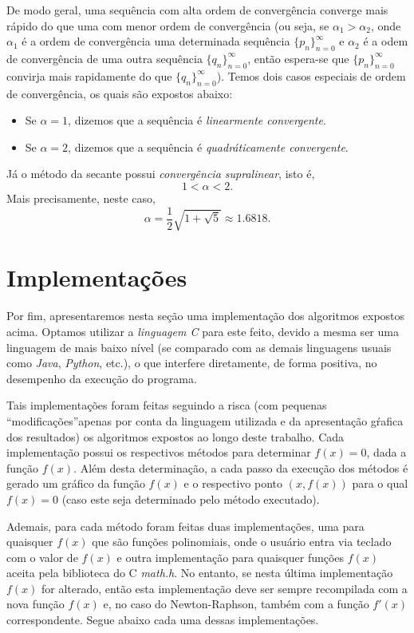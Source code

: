 \documentclass[a4paper, 10pt]{article} %
\theoremstyle{definition}
\theoremstyle{definition}
\numberwithin{equation}{section} %
\numberwithin{lstlisting}{section}
\numberwithin{algorithm}{section}
\numberwithin{table}{section}
\begin{document}
De modo geral, uma sequência com alta ordem de convergência converge mais rápido do que uma com menor ordem de convergência (ou seja, se $\alpha_1 > \alpha_2$, onde $\alpha_1$ é a ordem de convergência uma determinada sequência $\{p_n\}^{\infty}_{n = 0}$ e $\alpha_2$ é a odem de convergência de uma outra sequência $\{q_n\}^{\infty}_{n = 0}$, então espera-se que $\{p_n\}^{\infty}_{n = 0}$ convirja mais rapidamente do que $\{q_n\}^{\infty}_{n = 0}$). Temos dois casos especiais de ordem de convergência, os quais são expostos abaixo:

\begin{itemize}
\item Se $\alpha = 1$, dizemos que a sequência é \emph{linearmente convergente}.
\item Se $\alpha = 2$, dizemos que a sequência é \emph{quadráticamente convergente}.
\end{itemize}

Já o método da secante possui \emph{convergência supralinear}, isto é, \[1 < \alpha < 2\text{.}\] Mais precisamente, neste caso, \[\alpha = \frac{1}{2}\sqrt{1 + \sqrt{5}} \approx 1.6818\text{.}\]

\section{Implementações}

Por fim, apresentaremos nesta seção uma implementação dos algoritmos expostos acima. Optamos utilizar a \emph{linguagem C} para este feito, devido a mesma ser uma linguagem de mais baixo nível (se comparado com as demais linguagens usuais como \emph{Java}, \emph{Python}, etc.), o que interfere diretamente, de forma positiva, no desempenho da execução do programa. 

Tais implementações foram feitas seguindo a risca (com pequenas \textquotedblleft modificações\textquotedblright apenas por conta da linguagem utilizada e da apresentação gŕafica dos resultados) os algoritmos expostos ao longo deste trabalho. Cada implementação possui os respectivos métodos para determinar $f(x) = 0$, dada a função $f(x)$. Além desta determinação, a cada passo da execução dos métodos é gerado um gráfico da função $f(x)$ e o respectivo ponto $(x, f(x))$ para o qual $f(x) = 0$ (caso este seja determinado pelo método executado). 

Ademais, para cada método foram feitas duas implementações, uma para quaisquer $f(x)$ que são funções polinomiais, onde o usuário entra via teclado com o valor de $f(x)$ e outra implementação para quaisquer funções $f(x)$ aceita pela biblioteca do C \emph{math.h}. No entanto, se nesta última implementação $f(x)$ for alterado, então esta implementação deve ser sempre recompilada com a nova função $f(x)$ e, no caso do Newton-Raphson, também com a função $f'(x)$ correspondente. Segue abaixo cada uma dessas implementações.
   
\end{document}
